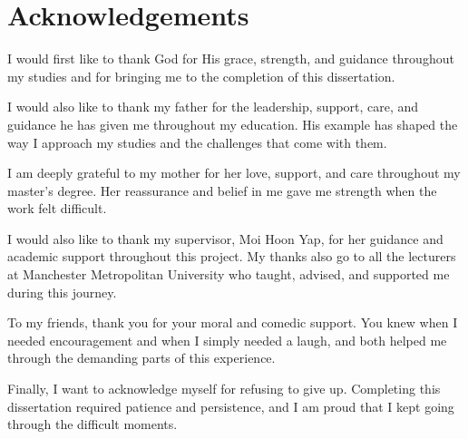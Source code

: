 \chapter*{Acknowledgements}

I would first like to thank God for His grace, strength, and guidance throughout my studies and for bringing me to the completion of this dissertation.

I would also like to thank my father for the leadership, support, care, and guidance he has given me throughout my education. His example has shaped the way I approach my studies and the challenges that come with them.

I am deeply grateful to my mother for her love, support, and care throughout my master's degree. Her reassurance and belief in me gave me strength when the work felt difficult.

I would also like to thank my supervisor, Moi Hoon Yap, for her guidance and academic support throughout this project. My thanks also go to all the lecturers at Manchester Metropolitan University who taught, advised, and supported me during this journey.

To my friends, thank you for your moral and comedic support. You knew when I needed encouragement and when I simply needed a laugh, and both helped me through the demanding parts of this experience.

Finally, I want to acknowledge myself for refusing to give up. Completing this dissertation required patience and persistence, and I am proud that I kept going through the difficult moments.
